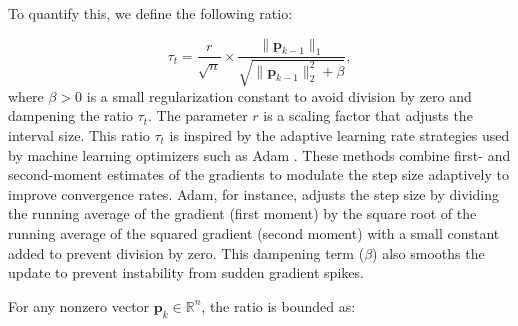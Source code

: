 \documentclass{elsarticle}
\numberwithin{equation}{section}
\begin{document}
To quantify this, we define the following ratio:

\begin{equation}\label{eq:A1}
    \tau_t = \frac{r}{\sqrt{n}} \times \frac{\| \mathbf{p}_{k-1} \|_1}{\sqrt{\| \mathbf{p}_{k-1} \|_2^2 + \beta}},
\end{equation}
\noindent
where \( \beta > 0 \) is a small regularization constant to avoid division by zero and dampening the ratio $\tau_t$. The parameter \( r \) is a scaling factor that adjusts the interval size. This ratio $\tau_t$ is inspired by the adaptive learning rate strategies used by machine learning optimizers such as Adam \cite{kingma2014adam}. These methods combine first- and second-moment estimates of the gradients to modulate the step size adaptively to improve convergence rates. Adam, for instance, adjusts the step size by dividing the running average of the gradient (first moment) by the square root of the running average of the squared gradient (second moment) with a small constant added to prevent division by zero. This dampening term ($\beta$) also smooths the update to prevent instability from sudden gradient spikes.

For any nonzero vector \( \mathbf{p}_k \in \mathbb{R}^n \), the ratio is bounded as:
\end{document}
